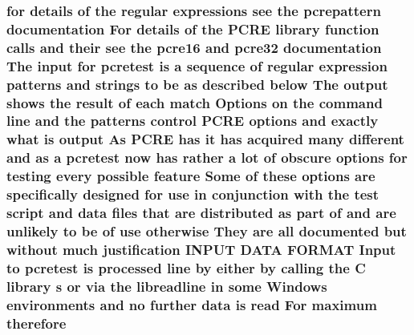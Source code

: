 \subsubsection[{\texorpdfstring{therefore}{therefore}}]{\setlength{\rightskip}{0pt plus 5cm}for {\bf details} {\bf of} the regular {\bf expressions} see the {\bf pcrepattern} {\bf documentation} For {\bf details} {\bf of} the {\bf P\+C\+RE} {\bf library} {\bf function} {\bf calls} and their see the {\bf pcre16} and {\bf pcre32} {\bf documentation} The {\bf input} for {\bf pcretest} {\bf is} {\bf a} {\bf sequence} {\bf of} regular {\bf expression} {\bf patterns} and {\bf strings} {\bf to} {\bf be} {\bf as} described {\bf below} The {\bf output} shows the {\bf result} {\bf of} each {\bf match} Options {\bf on} the {\bf command} {\bf line} and the {\bf patterns} control {\bf P\+C\+RE} {\bf options} and {\bf exactly} {\bf what} {\bf is} {\bf output} As {\bf P\+C\+RE} has {\bf it} has acquired many different and {\bf as} {\bf a} {\bf pcretest} {\bf now} has rather {\bf a} lot {\bf of} obscure {\bf options} for testing every {\bf possible} {\bf feature} Some {\bf of} these {\bf options} {\bf are} specifically designed for use {\bf in} conjunction {\bf with} the test {\bf script} and {\bf data} {\bf files} that {\bf are} {\bf distributed} {\bf as} part {\bf of} and {\bf are} unlikely {\bf to} {\bf be} {\bf of} use otherwise They {\bf are} {\bf all} documented but without much justification I\+N\+P\+UT {\bf D\+A\+TA} F\+O\+R\+M\+AT Input {\bf to} {\bf pcretest} {\bf is} processed {\bf line} by either by calling the {\bf C} {\bf library} {\bf s} {\bf or} via the libreadline {\bf in} some {\bf Windows} {\bf environments} and no further {\bf data} {\bf is} {\bf read} For maximum therefore}\hypertarget{pcretest_8txt_a2bed54b3ee1f3c00efc8637f8d424393}{}\label{pcretest_8txt_a2bed54b3ee1f3c00efc8637f8d424393}
